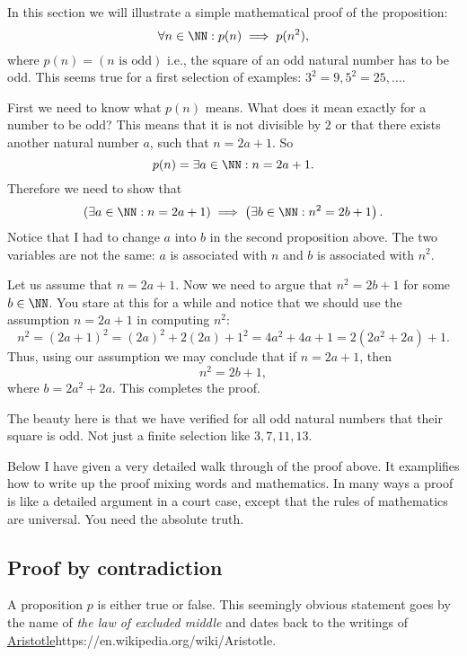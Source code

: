 \documentclass{article}
\begin{document}
In this section we will illustrate a simple mathematical proof of the
proposition:
$$
\forall n\in \NN: p(n)\implies p(n^2),
$$
where $p(n) = (n\text{ is odd})$ i.e., the square of an odd
natural number has to be odd. This seems true for a first selection
of examples: $3^2=9, 5^2=25, \dots$.

First we need to know what $p(n)$ means. What does it mean
exactly for a number to be odd? This means that it is
not divisible by $2$ or that there exists another
natural number $a$, such that $n = 2 a + 1$. So
$$
p(n) = \exists a\in \NN: n = 2 a + 1.
$$
Therefore we need to show that
$$
\left(\exists a\in \NN: n = 2 a + 1\right) \implies
\left(\exists b\in \NN: n^2 = 2 b + 1\right).
$$
Notice that I had to change $a$ into $b$ in the second proposition above.
The two variables are not the same: $a$ is associated with $n$ and
$b$ is associated with $n^2$.

Let us assume that $n = 2 a + 1$. Now we need to argue that $
n^2 = 2 b + 1$ for some $b\in \NN$. You stare at this for a while
and notice that we should use the assumption $n=2 a + 1$ in
computing $n^2$:
$$
n^2 = (2 a + 1)^2 = (2 a)^2 + 2 (2 a) + 1^2 = 4 a^2 + 4 a + 1 =
2(2 a^2 + 2 a) + 1.
$$
Thus, using our assumption we may conclude that if $n = 2 a + 1$, then
$$
n^2 = 2 b + 1,
$$
where $b=2a^2+ 2 a$. This completes the proof.

The beauty here is that we have verified for all odd natural numbers
that their square is odd. Not just a finite selection like
$3, 7, 11, 13$.

Below I have given a very detailed walk through of the proof above. It
examplifies how to write up the proof mixing words and mathematics. In
many ways a proof is like a detailed argument in a court case, except
that the rules of mathematics are universal. You need the absolute truth.

\begin{video}\label{Video:proofexample}
\end{video}




\subsection{Proof by contradiction}

A proposition $p$ is either true or false. This seemingly obvious statement
goes by the name of \emph{the law of excluded middle} and dates back to the writings
of \url{Aristotle}{https://en.wikipedia.org/wiki/Aristotle}.
\end{document}
